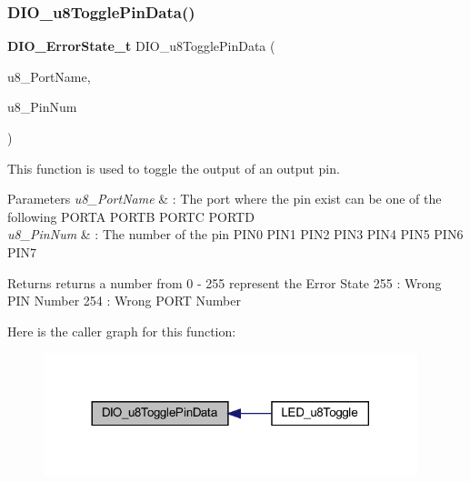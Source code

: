 \subsubsection{D\+I\+O\+\_\+u8\+Toggle\+Pin\+Data()}
{\footnotesize\ttfamily \textbf{ D\+I\+O\+\_\+\+Error\+State\+\_\+t} D\+I\+O\+\_\+u8\+Toggle\+Pin\+Data (\begin{DoxyParamCaption}\item[{\textbf{ D\+I\+O\+Port\+\_\+t}}]{u8\+\_\+\+Port\+Name,  }\item[{\textbf{ D\+I\+O\+Pin\+\_\+t}}]{u8\+\_\+\+Pin\+Num }\end{DoxyParamCaption})}



This function is used to toggle the output of an output pin. 


\begin{DoxyParams}{Parameters}
{\em u8\+\_\+\+Port\+Name} & \+: The port where the pin exist can be one of the following P\+O\+R\+TA P\+O\+R\+TB P\+O\+R\+TC P\+O\+R\+TD \\
\hline
{\em u8\+\_\+\+Pin\+Num} & \+: The number of the pin P\+I\+N0 P\+I\+N1 P\+I\+N2 P\+I\+N3 P\+I\+N4 P\+I\+N5 P\+I\+N6 P\+I\+N7 \\
\hline
\end{DoxyParams}
\begin{DoxyReturn}{Returns}
returns a number from 0 -\/ 255 represent the Error State 255 \+: Wrong P\+IN Number 254 \+: Wrong P\+O\+RT Number 
\end{DoxyReturn}
Here is the caller graph for this function\+:
\nopagebreak
\begin{figure}[H]
\begin{center}
\leavevmode
\includegraphics[width=308pt]{_d_i_o__interface_8h_a105d674e17ed95c8016fa7f6a1c6dde0_icgraph}
\end{center}
\end{figure}
